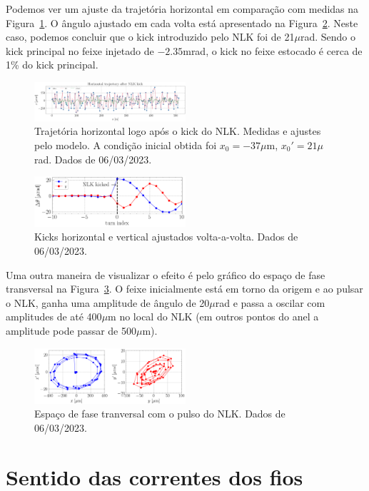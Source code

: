 \documentclass[a4paper,
               keeplastbox,   %
               ]{jacow}
\begin{document}
Podemos ver um ajuste da trajetória horizontal em comparação com medidas na Figura~\ref{fig:fit_traj}. O ângulo ajustado em cada volta está apresentado na Figura~\ref{fig:fit_angle}. Neste caso, podemos concluir que o kick introduzido pelo NLK foi de 21$\mu$rad. Sendo o kick principal no feixe injetado de $-2.35$mrad, o kick no feixe estocado é cerca de 1\% do kick principal.
\begin{figure}
    \centering
    \includegraphics*[width=0.5\textwidth]{fit_traj.png}
    \caption{Trajetória horizontal logo após o kick do NLK. Medidas e ajustes pelo modelo. A condição inicial obtida foi $x_0 = -37\mu$m, $x_0' = 21\mu$rad. Dados de 06/03/2023.}
    \label{fig:fit_traj}
\end{figure}
\begin{figure}
    \centering
    \includegraphics*[width=0.5\textwidth]{fit_kick_turns.png}
    \caption{Kicks horizontal e vertical ajustados volta-a-volta. Dados de 06/03/2023.}
    \label{fig:fit_angle}
\end{figure}

Uma outra maneira de visualizar o efeito é pelo gráfico do espaço de fase transversal na Figura~\ref{fig:phase_space}. O feixe inicialmente está em torno da origem e ao pulsar o NLK, ganha uma amplitude de ângulo de 20$\mu$rad e passa a oscilar com amplitudes de até 400$\mu$m no local do NLK (em outros pontos do anel a amplitude pode passar de 500$\mu$m).
\begin{figure}[!h]
    \centering
    \includegraphics*[width=0.5\textwidth]{phase_space.png}
    \caption{Espaço de fase tranversal com o pulso do NLK. Dados de 06/03/2023.}
    \label{fig:phase_space}
\end{figure}
\section{Sentido das correntes dos fios}
\end{document}
